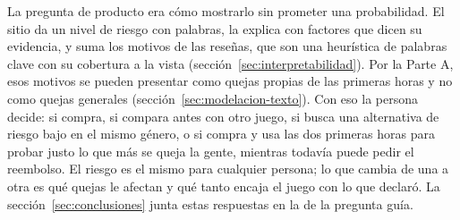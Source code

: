 La pregunta de producto era cómo mostrarlo sin prometer una probabilidad. El sitio da un nivel de
riesgo con palabras, la explica con factores que dicen su evidencia, y suma los motivos de las reseñas, que son
una heurística de palabras clave con su cobertura a la vista (sección~\ref{sec:interpretabilidad}).
Por la Parte A, esos motivos se pueden presentar como quejas propias de las primeras horas y no
como quejas generales (sección~\ref{sec:modelacion-texto}).
Con eso la persona decide: si compra, si compara antes con otro juego, si busca una alternativa de
riesgo bajo en el mismo género, o si compra y usa las dos primeras horas para probar justo lo que más
se queja la gente, mientras todavía puede pedir el reembolso. El riesgo es el mismo para cualquier
persona; lo que cambia de una a otra es qué quejas le afectan y qué tanto encaja el juego con lo que
declaró. La sección~\ref{sec:conclusiones} junta estas respuestas en la de la pregunta guía.
